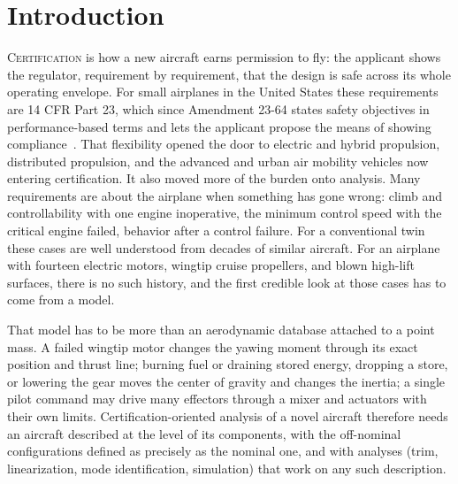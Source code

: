 \documentclass[conf]{new-aiaa}
\begin{document}
\section{Introduction}
\lettrine{C}{ertification} is how a new aircraft earns permission to fly: the applicant shows
the regulator, requirement by requirement, that the design is safe across its whole
operating envelope. For small airplanes in the United States these requirements are 14 CFR
Part 23, which since Amendment 23-64 states safety objectives in performance-based terms and
lets the applicant propose the means of showing compliance~\cite{part23}. That flexibility
opened the door to electric and hybrid propulsion, distributed propulsion, and the advanced
and urban air mobility vehicles now entering certification. It also moved more of the burden
onto analysis. Many requirements are about the airplane when something has gone wrong: climb
and controllability with one engine inoperative, the minimum control speed with the critical
engine failed, behavior after a control failure. For a conventional twin these cases are well
understood from decades of similar aircraft. For an airplane with fourteen electric motors,
wingtip cruise propellers, and blown high-lift surfaces, there is no such history, and the
first credible look at those cases has to come from a model.

That model has to be more than an aerodynamic database attached to a point mass. A failed
wingtip motor changes the yawing moment through its exact position and thrust line; burning
fuel or draining stored energy, dropping a store, or lowering the gear moves the center of
gravity and changes the inertia; a single pilot command may drive many effectors through a
mixer and actuators with their own limits. Certification-oriented analysis of a novel
aircraft therefore needs an aircraft described at the level of its components, with the
off-nominal configurations defined as precisely as the nominal one, and with analyses
(trim, linearization, mode identification, simulation) that work on any such description.
\end{document}
